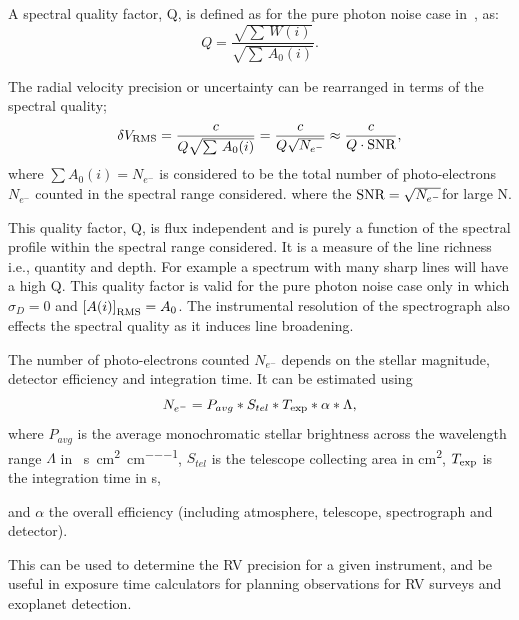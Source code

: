 A spectral quality factor, Q, is defined as for the pure photon noise case in~\cite{connes_absolute_1985, connes_demonstration_1996}, as:
\begin{equation}
Q = \frac{\sqrt{\sum{\,W(i)}}}{\sqrt{\sum{\,A_0(i)}}}.
\end{equation}

The radial velocity precision or uncertainty can be rearranged in terms of the spectral quality;
\begin{equation}
    \delta V_{\textrm{RMS}} = \frac{c}{Q \sqrt{\sum {\,A_0(i)}}} = \frac{c}{Q \sqrt{{N}_{{e}^{-}}}} \approx \frac{c}{Q \cdot \textrm{SNR}{}},  \label{eqn:snr_relation}
\end{equation}
where \(\sum A_0(i) = {N}_{{e}^{-}}\) is considered to be the total number of photo-electrons \({N}_{{e}^{-}}\) counted in the spectral range considered.
where the \({\textrm{SNR}{}}=\sqrt{N_{{e}^{-}}}\)for large N. 


This quality factor, Q, is flux independent and is purely a function of the spectral profile within the spectral range considered.
It is a measure of the line richness i.e., quantity and depth.
For example a spectrum with many sharp lines will have a high Q.
This quality factor is valid for the pure photon noise case only in which \(\sigma_{D} =0\) and \({[A(i)]}_{\textrm{RMS}} = A_0\).
The instrumental resolution of the spectrograph also effects the spectral quality as it induces line broadening.

The number of photo-electrons counted \(N_{{e}^{-}}\) depends on the stellar magnitude, detector efficiency and integration time.
It can be estimated using
\begin{equation}
     N_{{e}^{-}} = P_{avg} * S_{tel} * T_{\textrm{exp}} * \alpha* \Lambda,
\end{equation}
where \(P_{avg}\) is the average monochromatic stellar brightness
across the wavelength range \(\Lambda\) in \si{\photons\per\second\per\centi\metre\squared\per\centi\metre},
\(S_{tel}\) is the telescope collecting area in \si{\centi\metre\squared},
\(T_{\textrm{exp}}\) is the integration time in \si{\second},

and \(\alpha\) the overall efficiency (including atmosphere, telescope, spectrograph and detector).

This can be used to determine the {RV} precision for a given instrument, and be useful in exposure time calculators for planning observations for RV surveys and exoplanet detection.

